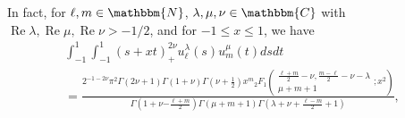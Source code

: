 \documentclass[12pt]{article}
\newcommand{\mybra}[1]{\left(#1\right)}
\numberwithin{equation}{section}
\newcommand{\tmop}[1]{\ensuremath{\operatorname{#1}}}
\begin{document}
\vspace{2em}
\begin{remark}
	In fact, 
  for $\ell, m \in \mathbbm{N}$,
  $\lambda, \mu, \nu \in \mathbbm{C}$ with $\tmop{Re} \lambda,
  \tmop{Re} \mu, \tmop{Re} \nu > - 1 / 2$, and for $- 1 \leqslant x \leqslant
  1$, we have
  \begin{multline}
     \displaystyle\int_{- 1}^1 \displaystyle\int_{- 1}^1 \mybra{ s + xt }_+^{2 \nu} u_{\ell}^{\lambda} (s)
    u_m^{\mu} (t) d s d t   \\
    \displaystyle= \frac{2^{-1-2\nu}\pi^2\Gamma(2\nu+1)
     \Gamma\left( 1+\nu \right)\Gamma \left( \nu + \frac{1}{2} \right) x^m{}_2 F_1
    \left( \begin{array}{c}
      \frac{\ell + m}{2} - \nu, \frac{m - \ell}{2} - \nu - \lambda\\
      \mu + m + 1
    \end{array} ; x^2 \right)}{\Gamma\left( 1+\nu {-\frac{\ell+m}{2}}\right)\Gamma (\mu + m + 1) \Gamma \left( \lambda +
    \nu + \frac{\ell - m}{2} + 1 \right)},  \nonumber
  \end{multline}
\end{remark}
\end{document}
